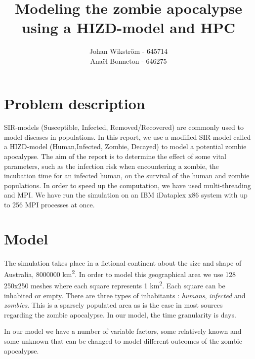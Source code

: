 \documentclass{article}
\title{Modeling the zombie apocalypse using a HIZD-model and HPC}
\author{Johan Wikström - 645714 \\
        Anaël Bonneton - 646275}
\begin{document}
\maketitle
\tableofcontents

\newpage

\section{Problem description}	

\paragraph{}
SIR-models (Susceptible, Infected, Removed/Recovered) are commonly used to model diseases in populations. In this report, we use a modified SIR-model called a HIZD-model (Human,Infected, Zombie, Decayed) to model a potential zombie apocalypse. The aim of the report is to determine the effect of some vital parameters, such as the infection risk when encountering a zombie, the incubation time for an infected human, on the survival of the human and zombie populations. In order to speed up the computation, we have used multi-threading and MPI\cite{openmpi}. We have run the simulation on an IBM iDataplex x86 system with up to 256 MPI processes at once.

\section{Model}

\paragraph{}
The simulation takes place in a fictional continent about the size and shape of Australia, 8000000 km\textsuperscript{2}. In order to model this geographical area we use 128 250x250 meshes where each square represents 1 km\textsuperscript{2}. Each square can be inhabited or empty. There are three types of inhabitants : \emph{humans}, \emph{infected} and \emph{zombies}. This is a sparsely populated area as is the case in most sources regarding the zombie apocalypse\cite{zombieland}. In our model, the time granularity is days.

In our model we have a number of variable factors, some relatively known and some unknown that can be changed to model different outcomes of the zombie apocalypse.
\end{document}
